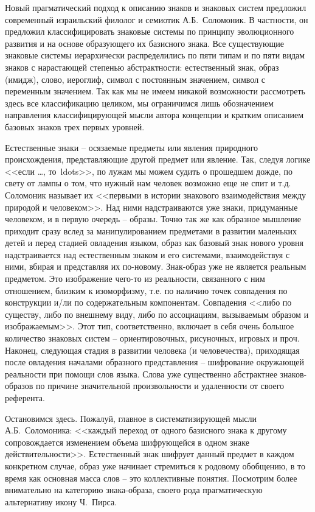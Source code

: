 Новый прагматический подход к описанию знаков и знаковых систем предложил
современный израильский филолог и семиотик А.Б.~Соломоник\autocites{solomonik1995}{solomonik2004}{solomonik2009}.
В частности, он предложил классифицировать знаковые системы по принципу
эволюционного развития и на основе образующего их базисного знака.
Все существующие знаковые системы иерархически распределились по пяти типам и
по пяти видам знаков с нарастающей степенью абстрактности: естественный знак,
образ (имидж), слово, иероглиф, символ с постоянным значением, символ с
переменным значением\autocite[][76-86]{solomonik2009}. Так как мы не имеем
никакой возможности рассмотреть здесь все классификацию целиком, мы
ограничимся лишь обозначением направления классифицирующей мысли автора
концепции и кратким описанием  базовых знаков трех первых уровней.

Естественные знаки -- осязаемые предметы или явления природного происхождения,
представляющие другой предмет или явление. Так, следуя логике <<если \ldots, то\ ldots>>,
по лужам мы можем судить о прошедшем дожде, по свету от лампы о том,
что нужный нам человек возможно еще не спит и т.д. Соломоник называет их
<<первыми в истории знакового взаимодействия между природой и человеком>>\autocite[][78]{solomonik2009}.
Над ними надстраиваются уже знаки, придуманные человеком, и в первую очередь --
образы. Точно так же как образное мышление приходит сразу вслед за
манипулированием предметами в развитии маленьких детей и перед стадией
овладения языком, образ как базовый знак нового уровня надстраивается над
естественным знаком и его системами, взаимодействуя с ними, вбирая и представляя
их по-новому. Знак-образ уже не является реальным предметом. Это изображение
чего-то из реальности, связанного с ним отношением, близким к изоморфизму,
т.е. по наличию точек совпадения по конструкции и/ли по содержательным
компонентам. Совпадения <<либо по существу, либо по внешнему виду, либо по
ассоциациям, вызываемым образом и изображаемым>>\autocite[][52]{solomonik1995}.
Этот тип, соответственно, включает в себя очень большое количество
знаковых систем -- ориентировочных, рисуночных, игровых и проч.
Наконец, следующая стадия в развитии человека (и человечества),
приходящая после овладения началами образного представления -- шифрование
окружающей реальности при помощи слов языка. Слова уже существенно абстрактнее
знаков-образов по причине значительной произвольности и удаленности от
своего референта.

Остановимся здесь. Пожалуй, главное в систематизирующей мысли А.Б.~Соломоника:
<<каждый переход от одного базисного знака к другому сопровождается изменением
объема шифрующейся в одном знаке действительности>>\autocite[][79]{solomonik2009}.
Естественный знак шифрует данный предмет в каждом конкретном случае, образ
уже начинает стремиться к родовому обобщению, в то время как основная
масса слов -- это коллективные понятия. Посмотрим более внимательно на категорию
знака-образа, своего рода прагматическую альтернативу икону Ч.~Пирса.

